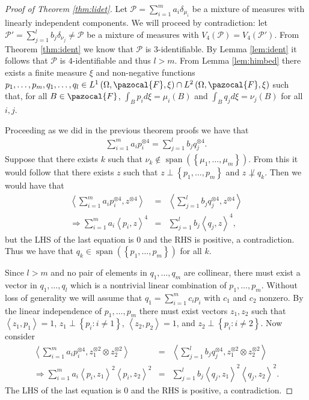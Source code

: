 \documentclass[aos,preprint]{imsart}
\def\l{\left}
\def\r{\right}
\def\sF{\pazocal{F}}
\def\sP{\mathscr{P}}
\def\spn{\operatorname{span}}
\theoremstyle{plain}
\theoremstyle{defintion}
\begin{document}
	\begin{proof}[Proof of Theorem \ref{thm:lidet}]
		Let $\sP = \sum_{i=1}^m a_i \delta_{\mu_i}$ be a mixture of measures with linearly independent components. We will proceed by contradiction:  let $\sP' = \sum_{j=1}^l  b_j \delta_{\nu_j} \neq \sP$ be a mixture of measures with $V_4(\sP) = V_4(\sP')$. From Theorem \ref{thm:ident} we know that $\sP$ is $3$-identifiable. By Lemma \ref{lem:ident} it follows that $\sP$ is $4$-identifiable and thus $l>m$. From Lemma \ref{lem:himbed} there exists a finite measure $\xi$ and non-negative functions $p_1,\ldots,p_m,q_1,\ldots,q_l \in L^1\left( \Omega, \sF, \xi \right)\cap L^2\left( \Omega, \sF, \xi \right)$ such that, for all $B\in \sF$, $\int_B p_i d\xi = \mu_i(B)$ and $\int_B q_j d\xi = \nu_j\left( B \right)$ for all $i,j$.

		Proceeding as we did in the previous theorem proofs we have that
		\begin{eqnarray*}
			\sum_{i=1}^m a_i p_i^{\otimes 4} = \sum_{j=1}^{l} b_j q_j^{\otimes 4}.
		\end{eqnarray*}
		Suppose that there exists $k$ such that $\nu_k \notin \spn\left( \left\{ \mu_1,\ldots,\mu_m \right\} \right)$. From this it would follow that there exists $z$ such that $z\perp \left\{ p_1,\ldots,p_m \right\}$ and $z \not \perp q_k$. Then we would have that 
		\begin{eqnarray*}
			\l<\sum_{i=1}^m a_i p_i^{\otimes 4},z^{\otimes 4}\r> &=& \l< \sum_{j=1}^{l} b_j q_j^{\otimes 4}, z^{\otimes 4}\r>\\
			\Rightarrow \sum_{i=1}^m a_i \l<p_i,z\r>^4 &=&  \sum_{j=1}^l b_j \l<q_j,z\r>^4,
		\end{eqnarray*}
		but the LHS of the last equation is 0 and the RHS is positive, a contradiction. Thus we have that $q_k \in \spn\left( \left\{ p_1,\ldots,p_m \right\} \right)$ for all $k$.

		Since $l>m$ and no pair of elements in $q_1,\ldots,q_m$ are collinear, there must exist a vector in $q_1,\ldots, q_l$ which is a nontrivial linear combination of $p_1,\ldots,p_m$. Without loss of generality we will assume that $q_1 = \sum_{i=1}^m c_i p_i$ with $c_1$ and $c_2$ nonzero. By the linear independence of $p_1,\ldots,p_m$ there must exist vectors $z_1,z_2$ such that $\l<z_1, p_1\r> =1$, $z_1 \perp \left\{ p_i : i\neq 1\right\}$, $\l<z_2,p_2\r> = 1$, and $z_2 \perp \left\{ p_i: i\neq 2 \right\}$. Now consider
		\begin{eqnarray*}
			\l<\sum_{i=1}^m a_i p_i^{\otimes 4},z_1^{\otimes 2} \otimes z_2^{\otimes 2}\r> &=& \l< \sum_{j=1}^{l} b_j q_j^{\otimes 4}, z_1^{\otimes 2} \otimes z_2^{\otimes 2}\r>\\
			\Rightarrow\sum_{i=1}^m a_i \l< p_i,z_1\r>^2 \l<p_i, z_2\r>^2 &=&\sum_{j=1}^{l} b_j\l<   q_j, z_1\r>^2 \l< q_j, z_2\r>^2.
		\end{eqnarray*}
		The LHS of the last equation is 0 and the RHS is positive, a contradiction.
	\end{proof}
\end{document}
